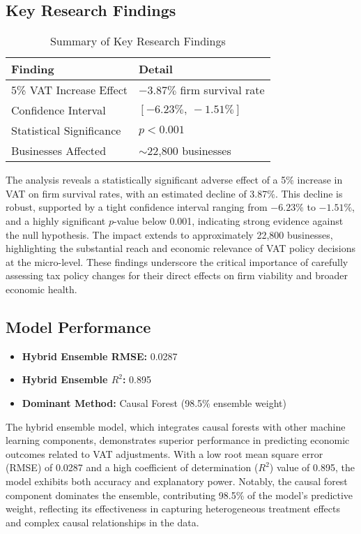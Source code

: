 \subsection{Key Research Findings}

\begin{table}[H]
\centering
\small
\caption{Summary of Key Research Findings}
\label{tab:key_findings}
\begin{tabular}{|p{4.5cm}|p{8cm}|}
\hline
\textbf{Finding} & \textbf{Detail} \\
\hline
5\% VAT Increase Effect & $-3.87\%$ firm survival rate \\
\hline
Confidence Interval & $[-6.23\%,\ -1.51\%]$ \\
\hline
Statistical Significance & $p < 0.001$ \\
\hline
Businesses Affected & $\sim$22,800 businesses \\
\hline
\end{tabular}
\end{table}

\vspace{0.5em}
\noindent
The analysis reveals a statistically significant adverse effect of a 5\% increase in VAT on firm survival rates, with an estimated decline of 3.87\%. This decline is robust, supported by a tight confidence interval ranging from $-6.23\%$ to $-1.51\%$, and a highly significant $p$-value below 0.001, indicating strong evidence against the null hypothesis. The impact extends to approximately 22,800 businesses, highlighting the substantial reach and economic relevance of VAT policy decisions at the micro-level. These findings underscore the critical importance of carefully assessing tax policy changes for their direct effects on firm viability and broader economic health.



\subsection{Model Performance}

\begin{itemize}
  \item \textbf{Hybrid Ensemble RMSE:} 0.0287
  \item \textbf{Hybrid Ensemble $R^2$:} 0.895
  \item \textbf{Dominant Method:} Causal Forest (98.5\% ensemble weight)
\end{itemize}

\vspace{0.5em}
\noindent
The hybrid ensemble model, which integrates causal forests with other machine learning components, demonstrates superior performance in predicting economic outcomes related to VAT adjustments. With a low root mean square error (RMSE) of 0.0287 and a high coefficient of determination ($R^2$) value of 0.895, the model exhibits both accuracy and explanatory power. Notably, the causal forest component dominates the ensemble, contributing 98.5\% of the model’s predictive weight, reflecting its effectiveness in capturing heterogeneous treatment effects and complex causal relationships in the data.




